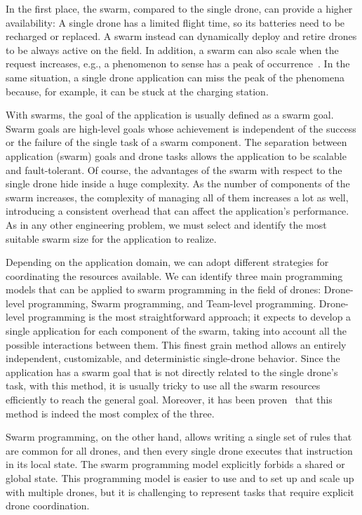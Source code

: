 In the first place, the swarm, compared to the single drone, can provide a higher availability: 
A single drone has a limited flight time, so its batteries need to be recharged or replaced. A swarm instead can dynamically 
deploy and retire drones to be always active on the field. In addition, a swarm can also scale when the request 
increases, e.g., a phenomenon to sense has a peak of occurrence~\cite{dantu2011karma}. 
In the same situation, a single drone application can miss the peak of the phenomena because, for example, it can be stuck at the charging station.

With swarms, the goal of the application is usually defined as a swarm goal.
Swarm goals are high-level goals whose achievement is independent of the success or the failure of the single task of a swarm component.
The separation between application (swarm) goals and drone tasks allows the application to be scalable and fault-tolerant.
Of course, the advantages of the swarm with respect to the single drone hide inside a huge complexity.
As the number of components of the swarm increases, the complexity of managing all of them increases a lot as well, 
introducing a consistent overhead that can affect the application's performance.
As in any other engineering problem, we must select and identify the most suitable swarm size for the application to realize.

Depending on the application domain, we can adopt different strategies for coordinating the resources available.
We can identify three main programming models that can be applied to swarm programming in the field of drones: Drone-level programming, Swarm programming, and Team-level programming.
Drone-level programming is the most straightforward approach; it expects to develop a single application for each component of the swarm, 
taking into account all the possible interactions between them. 
This finest grain method allows an entirely independent, customizable, and deterministic single-drone behavior. 
Since the application has a swarm goal that is not directly related to the single drone's task, 
with this method, it is usually tricky to use all the swarm resources efficiently to reach the general goal. 
Moreover, it has been proven~\cite{mottola2014team, dantu2011karma} that this method is indeed the most complex of the three.

Swarm programming\cite{quigley2009ros}, on the other hand, allows writing a single set of rules that are common for all drones, and then every single drone 
executes that instruction in its local state. The swarm programming model explicitly forbids a shared or global state.
This programming model is easier to use and to set up and scale up with multiple drones, but it is challenging to represent tasks that require explicit drone coordination.

